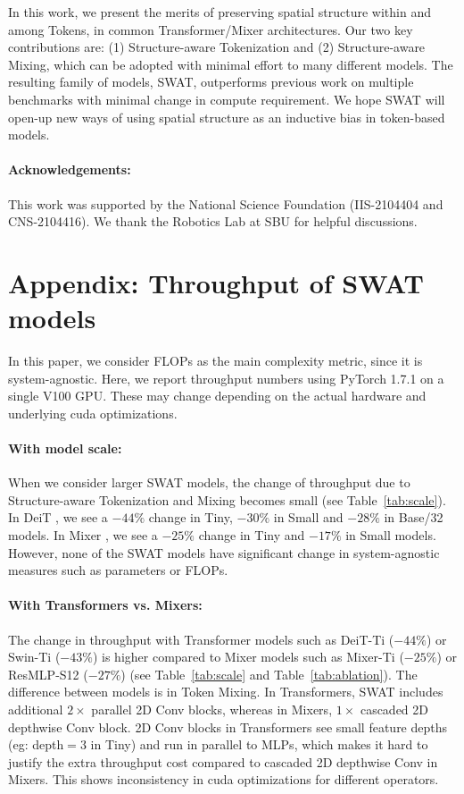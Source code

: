 \documentclass[10pt,twocolumn,letterpaper]{article}
\newcommand{\tref}[1]{Table~\ref{#1}}
\begin{document}
In this work, we present the merits of preserving spatial structure within and among Tokens, in common Transformer/Mixer architectures. Our two key contributions are: (1) Structure-aware Tokenization and (2) Structure-aware Mixing, which can be adopted with minimal effort to many different models. The resulting family of models, SWAT, outperforms previous work on multiple benchmarks with minimal change in compute requirement. We hope SWAT will open-up new ways of using spatial structure as an inductive bias in token-based models. %

\paragraph{Acknowledgements:} This work was supported by the National Science Foundation (IIS-2104404 and CNS-2104416). We thank the Robotics Lab at SBU for helpful discussions.


\newcount\cvprrulercount
\appendix


\section{Appendix: Throughput of SWAT models}
\label{sec:appendix}

In this paper, we consider FLOPs as the main complexity metric, since it is system-agnostic. Here, we report throughput numbers using PyTorch 1.7.1 on a single V100 GPU. These may change depending on the actual hardware and underlying cuda optimizations.

\paragraph{With model scale:} When we consider larger SWAT models, the change of throughput due to Structure-aware Tokenization and Mixing becomes small (see \tref{tab:scale}). In DeiT \cite{touvron2021deit}, we see a $-44\%$ change in Tiny, $-30\%$ in Small and $-28\%$ in Base/32 models. In Mixer \cite{tolstikhin2021mixer}, we see a $-25\%$ change in Tiny and $-17\%$ in Small models. However, none of the SWAT models have significant change in system-agnostic measures such as parameters or FLOPs.

\paragraph{With Transformers vs. Mixers:} The change in throughput with Transformer models such as DeiT-Ti ($-44\%$) \cite{touvron2021deit} or Swin-Ti \cite{liu2021swin} ($-43\%$) is higher compared to Mixer models such as Mixer-Ti \cite{tolstikhin2021mixer} ($-25\%$) or ResMLP-S12 \cite{touvron2021resmlp} ($-27\%$) (see \tref{tab:scale} and \tref{tab:ablation}). The difference between models is in Token Mixing. In Transformers, SWAT includes additional $2\times$ parallel 2D Conv blocks, whereas in Mixers, $1\times$ cascaded 2D depthwise Conv block. 2D Conv blocks in Transformers see small feature depths (eg: depth$=3$ in Tiny) and run in parallel to MLPs, which makes it hard to justify the extra throughput cost compared to cascaded 2D depthwise Conv in Mixers. This shows inconsistency in cuda optimizations for different operators.
\end{document}

